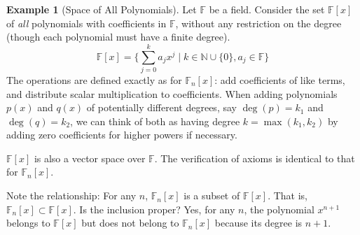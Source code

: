 \documentclass[11pt]{article}
\theoremstyle{definition}
\newtheorem{example}[theorem]{Example}
\newcommand{\F}{\mathbb{F}}
\newcommand{\N}{\mathbb{N}}
\newcommand{\Fn}[1]{\mathbb{F}_{#1}[x]}
\newcommand{\Fx}{\mathbb{F}[x]}
\begin{document}
\begin{example}[Space of All Polynomials]
Let $\F$ be a field. Consider the set $\Fx$ of \emph{all} polynomials with coefficients in $\F$, without any restriction on the degree (though each polynomial must have a finite degree).
\[ \Fx = \{ \sum_{j=0}^k a_j x^j \mid k \in \N \cup \{0\}, a_j \in \F \} \]
The operations are defined exactly as for $\Fn{n}$: add coefficients of like terms, and distribute scalar multiplication to coefficients. When adding polynomials $p(x)$ and $q(x)$ of potentially different degrees, say $\deg(p)=k_1$ and $\deg(q)=k_2$, we can think of both as having degree $k = \max(k_1, k_2)$ by adding zero coefficients for higher powers if necessary.

$\Fx$ is also a vector space over $\F$. The verification of axioms is identical to that for $\Fn{n}$.

Note the relationship: For any $n$, $\Fn{n}$ is a subset of $\Fx$. That is, $\Fn{n} \subset \Fx$. Is the inclusion proper? Yes, for any $n$, the polynomial $x^{n+1}$ belongs to $\Fx$ but does not belong to $\Fn{n}$ because its degree is $n+1$.
\end{example}
\end{document}
